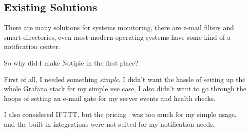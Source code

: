 \subsection{Existing Solutions}\label{sec:existing-solutions}

There are many solutions
for systems monitoring,
there are e-mail filters
and smart directories,
even most modern operating systems have some kind of a notification center.

So why did I make Notipie in the first place?

First of all,
I needed something \emph{simple}.
I didn't want the hassle of setting up
the whole Grafana stack for my simple use case,
I also didn't want to go through the hoops
of setting an e-mail gate
for my server events and health checks.

I also considered IFTTT,
but the pricing~\cite{ifttt_plans_2022}
was too much for my simple usage,
and the built-in integrations
were not suited for my notification needs.
